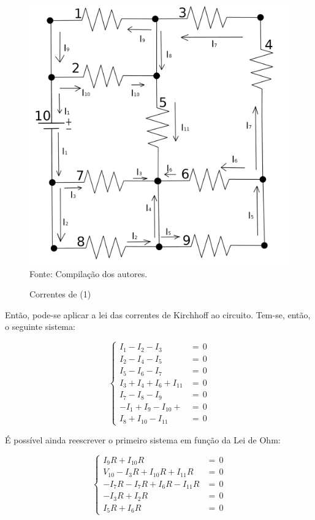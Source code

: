 \documentclass[twocolumn, 10pt,a4paper]{extarticle}
\begin{document}
\begin{figure}[H]
	\caption{Correntes de (1)} 
	\centering
	\includegraphics[scale=0.43]{circ22}
	\\ Fonte: Compilação dos autores.
\end{figure}

Então, pode-se aplicar a lei das correntes de Kirchhoff ao circuito. Tem-se, então, o seguinte sistema:

\[
\left\{
\begin{aligned}
    I_1 - I_2 - I_3 &= \, 0 \\
    I_2 - I_4 - I_5 &= \, 0 \\
    I_5 - I_6 - I_7 &= \, 0 \\
    I_3 + I_4 + I_6 + I_{11} &= \, 0 \\
    I_7 - I_8 - I_9 &= \, 0 \\
    - I_1 + I_9 - I_{10} + &= \, 0 \\
    I_8 + I_{10} - I_{11} &= \, 0 
\end{aligned}
\right.
\]

É possível ainda reescrever o primeiro sistema em função da Lei de Ohm:

\[
\left\{
\begin{aligned}
    I_9R + I_{10}R &= \,0 \\ 
    V_{10} - I_3R + I_{10}R + I_{11}R &= \,0 \\ 
	-I_7R - I_7R + I_6R - I_{11}R &= \,0 \\
	- I_3R + I_2R &= \,0 \\ 
	I_5R + I_6R &= \,0
\end{aligned}
\right.
\]
\end{document}
